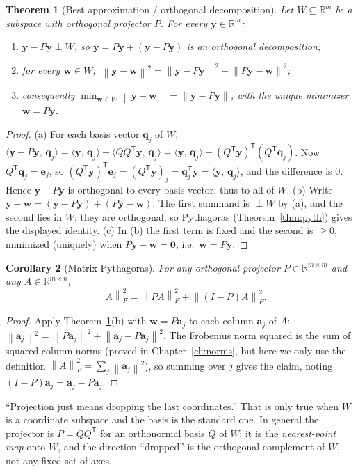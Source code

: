 \documentclass[11pt,oneside]{book}
\theoremstyle{plain}
\newtheorem{theorem}{Theorem}[chapter]
\newtheorem{corollary}[theorem]{Corollary}
\theoremstyle{definition}
\theoremstyle{remark}
\newcommand{\R}{\mathbb{R}}
\newcommand{\norm}[1]{\left\lVert #1 \right\rVert}
\newcommand{\fn}[1]{\norm{#1}_F}
\newcommand{\T}{^{\mathsf T}}
\newcommand{\inner}[2]{\langle #1,\, #2\rangle}
\newcommand{\bw}{\mathbf{w}}
\newcommand{\by}{\mathbf{y}}
\newcommand{\bq}{\mathbf{q}}
\newcommand{\ba}{\mathbf{a}}
\newcommand{\be}{\mathbf{e}}
\newcommand{\bzero}{\mathbf{0}}
\begin{document}
\begin{theorem}[Best approximation / orthogonal decomposition]\label{thm:bestapprox}
Let $W\subseteq\R^m$ be a subspace with orthogonal projector $P$. For every
$\by\in\R^m$:
\begin{enumerate}[label=\textup{(\alph*)},leftmargin=2em]
\item $\by-P\by\perp W$, so $\by=P\by+(\by-P\by)$ is an orthogonal decomposition;
\item for every $\bw\in W$, $\ \norm{\by-\bw}^2=\norm{\by-P\by}^2+\norm{P\by-\bw}^2$;
\item consequently $\displaystyle\min_{\bw\in W}\norm{\by-\bw}=\norm{\by-P\by}$, with the
unique minimizer $\bw=P\by$.
\end{enumerate}
\end{theorem}
\begin{proof}
(a) For each basis vector $\bq_j$ of $W$,
$\inner{\by-P\by}{\bq_j}=\inner{\by}{\bq_j}-\inner{QQ\T\by}{\bq_j}
=\inner{\by}{\bq_j}-(Q\T\by)\T(Q\T\bq_j)$. Now $Q\T\bq_j=\be_j$, so
$(Q\T\by)\T\be_j=(Q\T\by)_j=\bq_j\T\by=\inner{\by}{\bq_j}$, and the difference is $0$.
Hence $\by-P\by$ is orthogonal to every basis vector, thus to all of $W$.
(b) Write $\by-\bw=(\by-P\by)+(P\by-\bw)$. The first summand is $\perp W$ by (a), and
the second lies in $W$; they are orthogonal, so Pythagoras
(Theorem~\ref{thm:pyth}) gives the displayed identity.
(c) In (b) the first term is fixed and the second is $\ge0$, minimized (uniquely) when
$P\by-\bw=\bzero$, i.e.\ $\bw=P\by$.
\end{proof}

\begin{corollary}[Matrix Pythagoras]\label{cor:matpyth}
For any orthogonal projector $P\in\R^{m\times m}$ and any $A\in\R^{m\times n}$,
\[
\fn{A}^2=\fn{PA}^2+\fn{(I-P)A}^2 .
\]
\end{corollary}
\begin{proof}
Apply Theorem~\ref{thm:bestapprox}(b) with $\bw=P\ba_j$ to each column $\ba_j$ of $A$:
$\norm{\ba_j}^2=\norm{P\ba_j}^2+\norm{\ba_j-P\ba_j}^2$. The Frobenius norm squared is the
sum of squared column norms (proved in Chapter~\ref{ch:norms}, but here we only use the
definition $\fn{A}^2=\sum_j\norm{\ba_j}^2$), so summing over $j$ gives the claim, noting
$(I-P)\ba_j=\ba_j-P\ba_j$.
\end{proof}

\begin{miscon_box}
``Projection just means dropping the last coordinates.'' That is only true when $W$ is a
coordinate subspace and the basis is the standard one. In general the projector is
$P=QQ\T$ for an orthonormal basis $Q$ of $W$; it is the \emph{nearest-point map} onto
$W$, and the direction ``dropped'' is the orthogonal complement of $W$, not any fixed
set of axes.
\end{miscon_box}
\end{document}
